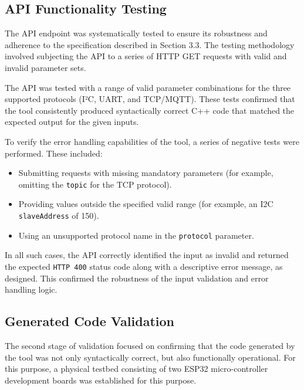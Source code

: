 \subsection{API Functionality Testing}
\label{subsec:api_testing}

The API endpoint was systematically tested to ensure its robustness and adherence to the specification described in Section 3.3. The testing methodology involved subjecting the API to a series of HTTP GET requests with valid and invalid parameter sets.

The API was tested with a range of valid parameter combinations for the three supported protocols (I²C, UART, and TCP/MQTT). These tests confirmed that the tool consistently produced syntactically correct C++ code that matched the expected output for the given inputs.

To verify the error handling capabilities of the tool, a series of negative tests were performed. These included:
\begin{itemize}
    \item Submitting requests with missing mandatory parameters (for example, omitting the \texttt{topic} for the TCP protocol).
    \item Providing values outside the specified valid range (for example, an I2C \texttt{slaveAddress} of 150).
    \item Using an unsupported protocol name in the \texttt{protocol} parameter.
\end{itemize}
In all such cases, the API correctly identified the input as invalid and returned the expected \texttt{HTTP 400} status code along with a descriptive error message, as designed. This confirmed the robustness of the input validation and error handling logic.

\subsection{Generated Code Validation}
\label{subsec:code_validation}

The second stage of validation focused on confirming that the code generated by the tool was not only syntactically correct, but also functionally operational. For this purpose, a physical testbed consisting of two ESP32 micro-controller development boards was established for this purpose.

